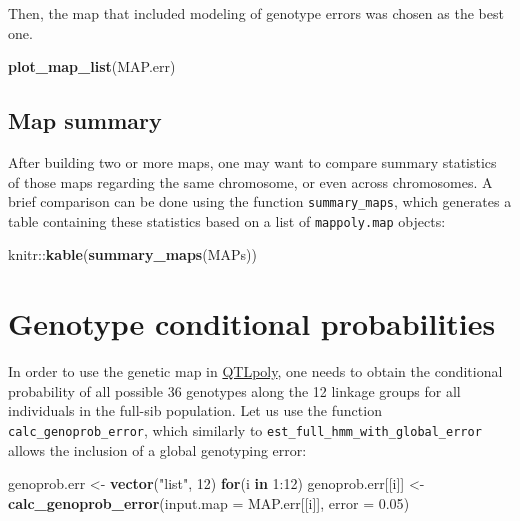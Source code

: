 \documentclass[
]{article}
\newenvironment{Shaded}{}{}
\newcommand{\ControlFlowTok}[1]{\textcolor[rgb]{0.00,0.44,0.13}{\textbf{#1}}}
\newcommand{\DataTypeTok}[1]{\textcolor[rgb]{0.56,0.13,0.00}{#1}}
\newcommand{\DecValTok}[1]{\textcolor[rgb]{0.25,0.63,0.44}{#1}}
\newcommand{\FloatTok}[1]{\textcolor[rgb]{0.25,0.63,0.44}{#1}}
\newcommand{\KeywordTok}[1]{\textcolor[rgb]{0.00,0.44,0.13}{\textbf{#1}}}
\newcommand{\NormalTok}[1]{#1}
\newcommand{\OperatorTok}[1]{\textcolor[rgb]{0.40,0.40,0.40}{#1}}
\newcommand{\StringTok}[1]{\textcolor[rgb]{0.25,0.44,0.63}{#1}}
\begin{document}
Then, the map that included modeling of genotype errors was chosen as
the best one.

\begin{Shaded}
\begin{Highlighting}[]
\KeywordTok{plot_map_list}\NormalTok{(MAP.err)}
\end{Highlighting}
\end{Shaded}

\hypertarget{map-summary}{%
\subsection{Map summary}\label{map-summary}}

After building two or more maps, one may want to compare summary
statistics of those maps regarding the same chromosome, or even across
chromosomes. A brief comparison can be done using the function
\texttt{summary\_maps}, which generates a table containing these
statistics based on a list of \texttt{mappoly.map} objects:

\begin{Shaded}
\begin{Highlighting}[]
\NormalTok{knitr}\OperatorTok{::}\KeywordTok{kable}\NormalTok{(}\KeywordTok{summary_maps}\NormalTok{(MAPs))}
\end{Highlighting}
\end{Shaded}

\hypertarget{genotype-conditional-probabilities}{%
\section{Genotype conditional
probabilities}\label{genotype-conditional-probabilities}}

In order to use the genetic map in
\href{https://github.com/guilherme-pereira/QTLpoly}{QTLpoly}, one needs
to obtain the conditional probability of all possible 36 genotypes along
the 12 linkage groups for all individuals in the full-sib population.
Let us use the function \texttt{calc\_genoprob\_error}, which similarly
to \texttt{est\_full\_hmm\_with\_global\_error} allows the inclusion of
a global genotyping error:

\begin{Shaded}
\begin{Highlighting}[]
\NormalTok{genoprob.err <-}\StringTok{ }\KeywordTok{vector}\NormalTok{(}\StringTok{"list"}\NormalTok{, }\DecValTok{12}\NormalTok{)}
\ControlFlowTok{for}\NormalTok{(i }\ControlFlowTok{in} \DecValTok{1}\OperatorTok{:}\DecValTok{12}\NormalTok{)}
\NormalTok{genoprob.err[[i]] <-}\StringTok{ }\KeywordTok{calc_genoprob_error}\NormalTok{(}\DataTypeTok{input.map =}\NormalTok{ MAP.err[[i]], }\DataTypeTok{error =} \FloatTok{0.05}\NormalTok{)}
\end{Highlighting}
\end{Shaded}
\end{document}
